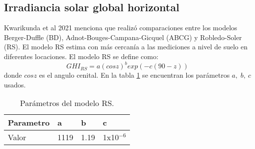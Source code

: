 \subsection{Irradiancia solar global horizontal}
Kwarikunda et al 2021\cite{Kwarikunda_2021} menciona que realizó comparaciones entre los modelos Berger-Duffle (BD), Adnot-Bouges-Campana-Gicquel (ABCG) y Robledo-Soler (RS). El modelo RS estima con más cercanía a las mediciones a nivel de suelo en diferentes locaciones. El modelo RS se define como:
\begin{equation}
	GHI_{RS} = a(cos z)^b exp(-c(90-z))
	\label{eq:rs_model}
\end{equation}
donde $cos z$ es el angulo cenital. En la tabla \ref{table:rs_parameters} se encuentran los parámetros $a,\;b,\:c$ usados.
\begin{table}[H]
	\centering
	\begin{tabular}{llll} \hline
		\textbf{Parametro } & \textbf{a} & \textbf{b} & \textbf{c}    \\ \hline
		Valor               & 1119       & 1.19       & 1x10$^{-6  }$ \\ \hline
	\end{tabular}
	\caption{Parámetros del modelo RS.}
	\label{table:rs_parameters}
\end{table}
